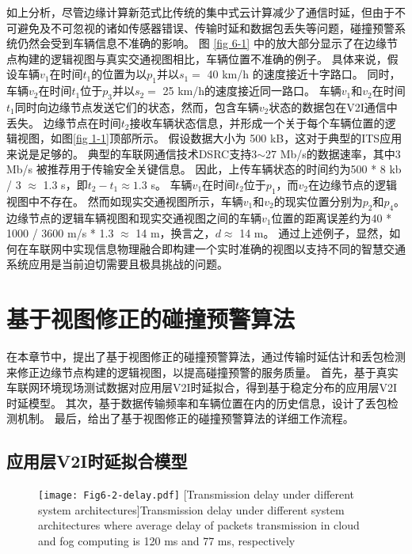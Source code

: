 如上分析，尽管边缘计算新范式比传统的集中式云计算减少了通信时延，但由于不可避免及不可忽视的诸如传感器错误、传输时延和数据包丢失等问题，碰撞预警系统仍然会受到车辆信息不准确的影响。
图 \ref{fig 6-1} 中的放大部分显示了在边缘节点构建的逻辑视图与真实交通视图相比，车辆位置不准确的例子。
具体来说，假设车辆$v_1$在时间$t_1$的位置为以$p_1$并以$s_1 =$ 40 km/h 的速度接近十字路口。
同时，车辆$v_2$在时间$t_1$位于$p_3$并以$s_2=$ 25 km/h的速度接近同一路口。
车辆$v_1$和$v_2$在时间$t_1$同时向边缘节点发送它们的状态，然而，包含车辆$v_2$状态的数据包在V2I通信中丢失。
边缘节点在时间$t_2$接收车辆状态信息，并形成一个关于每个车辆位置的逻辑视图，如图\ref{fig 1-1}顶部所示。
假设数据大小为 500 kB，这对于典型的ITS应用来说是足够的\cite{liu2013improving}。
典型的车联网通信技术DSRC支持3$\sim$27 Mb/s的数据速率，其中3 Mb/s 被推荐用于传输安全关键信息\cite{kenney2011dedicated}。
因此，上传车辆状态的时间约为500 * 8 kb / 3 $\approx$ 1.3 s，即${t_2} - {t_1} \approx 1.3$ s。
车辆$v_1$在时间$t_2$位于$p_1$，而$v_2$在边缘节点的逻辑视图中不存在。
然而如现实交通视图所示，车辆$v_1$和$v_2$的现实位置分别为$p_2$和$p_4$。
边缘节点的逻辑车辆视图和现实交通视图之间的车辆$v_1$位置的距离误差约为40 * 1000 / 3600 m/s * 1.3 $\approx$ 14 m，换言之，$d \approx$ 14 m。
通过上述例子，显然，如何在车联网中实现信息物理融合即构建一个实时准确的视图以支持不同的智慧交通系统应用是当前迫切需要且极具挑战的问题。

\section{基于视图修正的碰撞预警算法}\label{section 6-3}

在本章节中，提出了基于视图修正的碰撞预警算法，通过传输时延估计和丢包检测来修正边缘节点构建的逻辑视图，以提高碰撞预警的服务质量。
首先，基于真实车联网环境现场测试数据对应用层V2I时延拟合，得到基于稳定分布的应用层V2I时延模型。
其次，基于数据传输频率和车辆位置在内的历史信息，设计了丢包检测机制。
最后，给出了基于视图修正的碰撞预警算法的详细工作流程。

\subsection{应用层V2I时延拟合模型}

\begin{figure}[h]
\centering
  \texttt{[image: Fig6-2-delay.pdf]}
  [Transmission delay under different system architectures]{Transmission delay under different system architectures where average delay of packets transmission in cloud and fog computing is 120 ms and 77 ms, respectively}
  \label{fig 6-2}
\end{figure}

